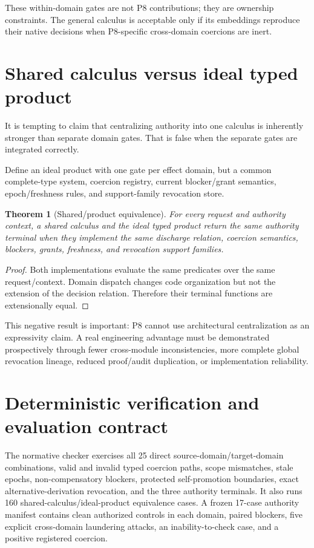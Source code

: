 \documentclass[11pt]{article}
\newtheorem{theorem}{Theorem}
\begin{document}
These within-domain gates are not P8 contributions; they are ownership constraints. The general calculus is acceptable only if its embeddings reproduce their native decisions when P8-specific cross-domain coercions are inert.

\section{Shared calculus versus ideal typed product}
It is tempting to claim that centralizing authority into one calculus is inherently stronger than separate domain gates. That is false when the separate gates are integrated correctly.

Define an ideal product with one gate per effect domain, but a common complete-type system, coercion registry, current blocker/grant semantics, epoch/freshness rules, and support-family revocation store.

\begin{theorem}[Shared/product equivalence]
For every request and authority context, a shared calculus and the ideal typed product return the same authority terminal when they implement the same discharge relation, coercion semantics, blockers, grants, freshness, and revocation support families.
\end{theorem}
\begin{proof}
Both implementations evaluate the same predicates over the same request/context. Domain dispatch changes code organization but not the extension of the decision relation. Therefore their terminal functions are extensionally equal.
\end{proof}

This negative result is important: P8 cannot use architectural centralization as an expressivity claim. A real engineering advantage must be demonstrated prospectively through fewer cross-module inconsistencies, more complete global revocation lineage, reduced proof/audit duplication, or implementation reliability.

\section{Deterministic verification and evaluation contract}
The normative checker exercises all 25 direct source-domain/target-domain combinations, valid and invalid typed coercion paths, scope mismatches, stale epochs, non-compensatory blockers, protected self-promotion boundaries, exact alternative-derivation revocation, and the three authority terminals. It also runs 160 shared-calculus/ideal-product equivalence cases. A frozen 17-case authority manifest contains clean authorized controls in each domain, paired blockers, five explicit cross-domain laundering attacks, an inability-to-check case, and a positive registered coercion.
\end{document}

